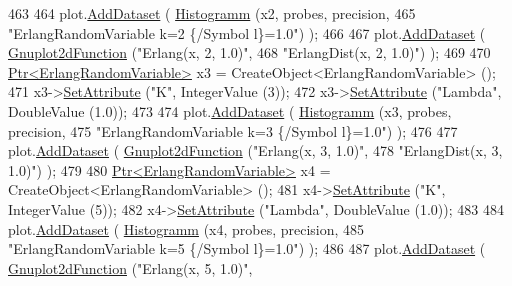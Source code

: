 \begin{DoxyCode}
463 
464     plot.\hyperlink{classns3_1_1Gnuplot_a306ec724a327cf9ab699700f31fca0a1}{AddDataset} ( \hyperlink{main-random-variable_8cc_a2cfd3837ab3f2e816cf53486d7a186b5}{Histogramm} (x2, probes, precision,
465                                   \textcolor{stringliteral}{"ErlangRandomVariable k=2 \{/Symbol l\}=1.0"}) );
466 
467     plot.\hyperlink{classns3_1_1Gnuplot_a306ec724a327cf9ab699700f31fca0a1}{AddDataset} ( \hyperlink{classns3_1_1Gnuplot2dFunction}{Gnuplot2dFunction} (\textcolor{stringliteral}{"Erlang(x, 2, 1.0)"},
468                                          \textcolor{stringliteral}{"ErlangDist(x, 2, 1.0)"}) );
469 
470     \hyperlink{classns3_1_1Ptr}{Ptr<ErlangRandomVariable>} x3 = CreateObject<ErlangRandomVariable> ();
471     x3->\hyperlink{classns3_1_1ObjectBase_ac60245d3ea4123bbc9b1d391f1f6592f}{SetAttribute} (\textcolor{stringliteral}{"K"}, IntegerValue (3));
472     x3->\hyperlink{classns3_1_1ObjectBase_ac60245d3ea4123bbc9b1d391f1f6592f}{SetAttribute} (\textcolor{stringliteral}{"Lambda"}, DoubleValue (1.0));
473 
474     plot.\hyperlink{classns3_1_1Gnuplot_a306ec724a327cf9ab699700f31fca0a1}{AddDataset} ( \hyperlink{main-random-variable_8cc_a2cfd3837ab3f2e816cf53486d7a186b5}{Histogramm} (x3, probes, precision,
475                                   \textcolor{stringliteral}{"ErlangRandomVariable k=3 \{/Symbol l\}=1.0"}) );
476 
477     plot.\hyperlink{classns3_1_1Gnuplot_a306ec724a327cf9ab699700f31fca0a1}{AddDataset} ( \hyperlink{classns3_1_1Gnuplot2dFunction}{Gnuplot2dFunction} (\textcolor{stringliteral}{"Erlang(x, 3, 1.0)"},
478                                          \textcolor{stringliteral}{"ErlangDist(x, 3, 1.0)"}) );
479 
480     \hyperlink{classns3_1_1Ptr}{Ptr<ErlangRandomVariable>} x4 = CreateObject<ErlangRandomVariable> ();
481     x4->\hyperlink{classns3_1_1ObjectBase_ac60245d3ea4123bbc9b1d391f1f6592f}{SetAttribute} (\textcolor{stringliteral}{"K"}, IntegerValue (5));
482     x4->\hyperlink{classns3_1_1ObjectBase_ac60245d3ea4123bbc9b1d391f1f6592f}{SetAttribute} (\textcolor{stringliteral}{"Lambda"}, DoubleValue (1.0));
483 
484     plot.\hyperlink{classns3_1_1Gnuplot_a306ec724a327cf9ab699700f31fca0a1}{AddDataset} ( \hyperlink{main-random-variable_8cc_a2cfd3837ab3f2e816cf53486d7a186b5}{Histogramm} (x4, probes, precision,
485                                   \textcolor{stringliteral}{"ErlangRandomVariable k=5 \{/Symbol l\}=1.0"}) );
486 
487     plot.\hyperlink{classns3_1_1Gnuplot_a306ec724a327cf9ab699700f31fca0a1}{AddDataset} ( \hyperlink{classns3_1_1Gnuplot2dFunction}{Gnuplot2dFunction} (\textcolor{stringliteral}{"Erlang(x, 5, 1.0)"},

\end{DoxyCode}
